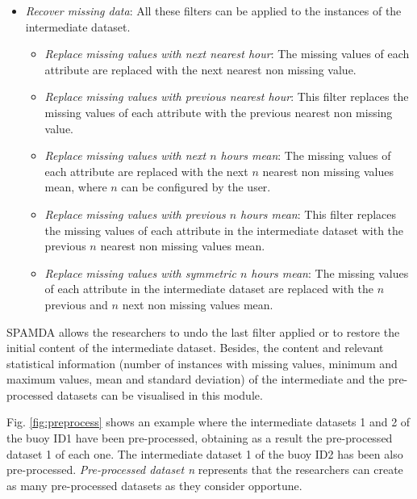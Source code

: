 \documentclass[energies,article,submit,moreauthors,pdftex]{Definitions/mdpi}
\begin{document}
\begin{itemize}
				 \item \textit{Recover missing data}: All these filters can be applied to the instances of the intermediate dataset.
					\begin{itemize}
						\item \textit{Replace missing values with next nearest hour}: The missing values of each attribute are replaced with the next nearest non missing value.
						\item \textit{Replace missing values with previous nearest hour}: This filter replaces the missing values of each attribute with the previous nearest non missing value.
						\item \textit{Replace missing values with next $n$ hours mean}: The missing values of each attribute are replaced with the next $n$ nearest non missing values mean, where $n$ can be configured by the user.
						\item \textit{Replace missing values with previous $n$ hours mean}: This filter replaces the missing values of each attribute in the intermediate dataset with the previous $n$ nearest non missing values mean.
						\item \textit{Replace missing values with symmetric $n$ hours mean}: The missing values of each attribute in the intermediate dataset are replaced with the $n$ previous and $n$ next non missing values mean.
					\end{itemize}
				 
				\end{itemize}
				
				SPAMDA allows the researchers to undo the last filter applied or to restore the initial content of the intermediate dataset. Besides, the content and relevant statistical information (number of instances with missing values, minimum and maximum values, mean and standard deviation) of the intermediate and the pre-processed datasets can be visualised in this module.
				
				Fig. \ref{fig:preprocess} shows an example where the intermediate datasets 1 and 2 of the buoy ID1 have been pre-processed, obtaining as a result the pre-processed dataset 1 of each one. The intermediate dataset 1 of the buoy ID2 has been also pre-processed. \textit{Pre-processed dataset n} represents that the researchers can create as many pre-processed datasets as they consider opportune.
				
\end{document}
